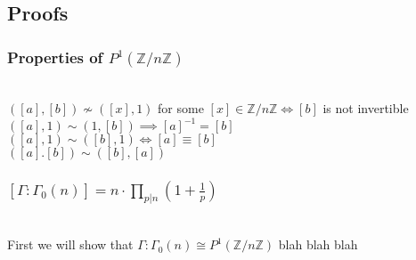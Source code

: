 \documentclass[11pt, oneside]{amsart}
\begin{document}
\subsection{Proofs}
\subsubsection{Properties of $P^1(\mathbb{Z}/ n \mathbb{Z})$}
\quad \\
$([a],[b]) \not\sim  ([x], 1)$ for some $[x]\in\mathbb{Z}/n \mathbb{Z} \iff [b]$ is not invertible
\\
$([a],1)\sim (1,[b]) \implies [a]^{-1} = [b]$
\\
$([a],1)\sim ([b],1) \iff [a] \equiv [b]$
\\
$([a].[b])\sim ([b],[a])$

\subsubsection{$\left[\Gamma : \Gamma_{0}(n)\right]=n \cdot \prod_{p|n}\left(1+\frac{1}{p}\right)$}
\quad \\
First we will show that $\Gamma : \Gamma_{0}(n) \cong P^1(\mathbb{Z}/ n \mathbb{Z})$
blah blah blah
\end{document}
